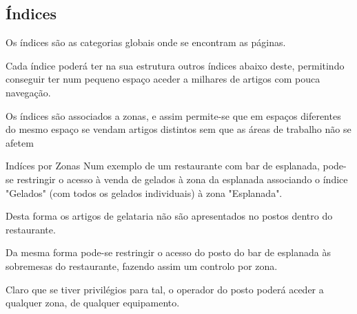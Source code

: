 \documentclass[a4paper,11pt,openany]{memoir}
\begin{document}
\subsection{Índices}

Os índices são as categorias globais onde se encontram as páginas. 

Cada índice poderá ter na sua estrutura outros índices abaixo deste, permitindo conseguir ter num pequeno
espaço aceder a milhares de artigos com pouca navegação.

Os índices são associados a zonas, e assim permite-se que em espaços diferentes do mesmo espaço se vendam 
artigos distintos sem que as áreas de trabalho não se afetem 


\begin{bclogo}[couleur=blue!10,arrondi=0.1,logo=\bccrayon,ombre=true]{Indíces por Zonas}
Num exemplo de um restaurante com bar de esplanada, pode-se restringir o acesso à venda de gelados
à zona da esplanada associando o índice "Gelados" (com todos os gelados individuais) à zona "Esplanada".

Desta forma os artigos de gelataria não são apresentados no postos dentro do restaurante. 

Da mesma forma pode-se restringir o acesso do posto do bar de esplanada às sobremesas do restaurante, fazendo assim um controlo por zona.

Claro que se tiver privilégios para tal, o operador do posto poderá aceder a qualquer zona, de qualquer equipamento.
\end{bclogo}
  
\end{document}
